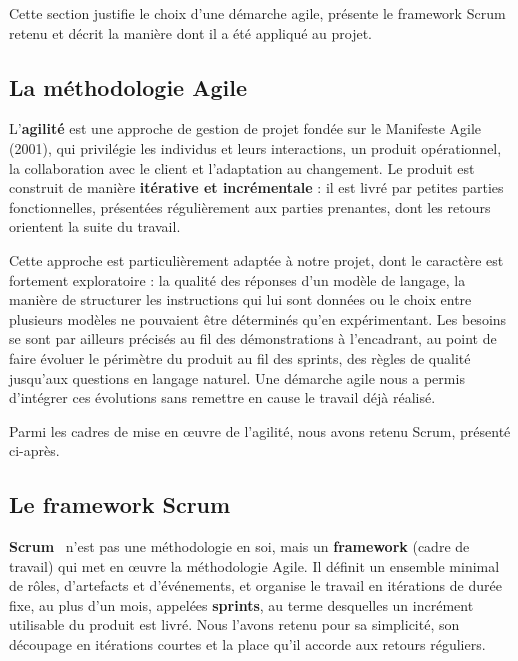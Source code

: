 Cette section justifie le choix d'une démarche agile, présente le framework Scrum retenu et décrit la manière dont il a été appliqué au projet.

\subsection{La méthodologie Agile}

L'\textbf{agilité} est une approche de gestion de projet fondée sur le Manifeste Agile (2001), qui privilégie les individus et leurs interactions, un produit opérationnel, la collaboration avec le client et l'adaptation au changement. Le produit est construit de manière \textbf{itérative et incrémentale} : il est livré par petites parties fonctionnelles, présentées régulièrement aux parties prenantes, dont les retours orientent la suite du travail.

Cette approche est particulièrement adaptée à notre projet, dont le caractère est fortement exploratoire : la qualité des réponses d'un modèle de langage, la manière de structurer les instructions qui lui sont données ou le choix entre plusieurs modèles ne pouvaient être déterminés qu'en expérimentant. Les besoins se sont par ailleurs précisés au fil des démonstrations à l'encadrant, au point de faire évoluer le périmètre du produit au fil des sprints, des règles de qualité jusqu'aux questions en langage naturel. Une démarche agile nous a permis d'intégrer ces évolutions sans remettre en cause le travail déjà réalisé.

Parmi les cadres de mise en œuvre de l'agilité, nous avons retenu Scrum, présenté ci-après.

\subsection{Le framework Scrum}

\textbf{Scrum}~\cite{scrum} n'est pas une méthodologie en soi, mais un \textbf{framework} (cadre de travail) qui met en œuvre la méthodologie Agile. Il définit un ensemble minimal de rôles, d'artefacts et d'événements, et organise le travail en itérations de durée fixe, au plus d'un mois, appelées \textbf{sprints}, au terme desquelles un incrément utilisable du produit est livré. Nous l'avons retenu pour sa simplicité, son découpage en itérations courtes et la place qu'il accorde aux retours réguliers.


